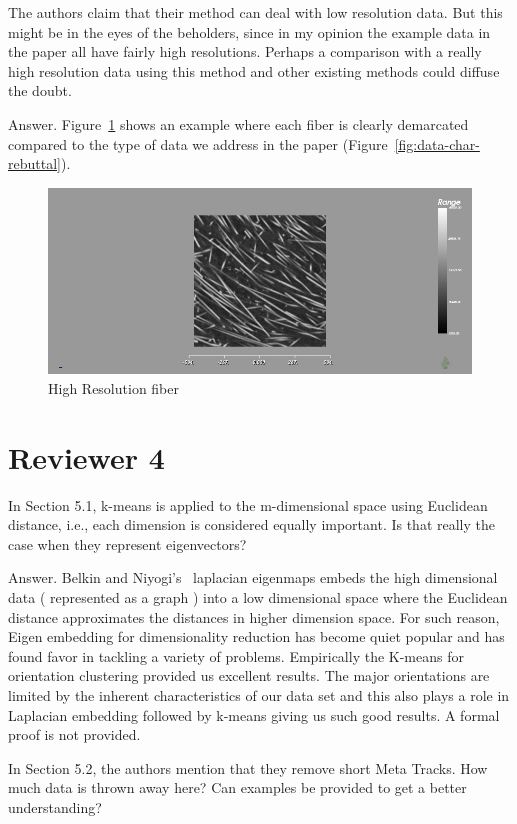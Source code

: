 \documentclass[]{article}
\begin{document}
\color{red}
The authors claim that their method can deal with low resolution data.
But this might be in the eyes of the beholders, since in my opinion the example data in the paper all have fairly high resolutions. Perhaps a comparison with a really high resolution data using this method and other existing methods could diffuse the doubt.
\color{black}

Answer. Figure~\ref{fig:glass_fibers} shows an example where each fiber is clearly demarcated compared to the type of data we address in the paper (Figure~\ref{fig:data-char-rebuttal}).
\begin{figure}
\centering
\includegraphics[width=0.7\linewidth]{images_pvis/glass_fibers}
\caption{High Resolution fiber}
\label{fig:glass_fibers}
\end{figure}


\section{Reviewer 4}
\color{red}
In Section 5.1, k-means is applied to the m-dimensional space using
Euclidean distance, i.e., each dimension is considered equally important.
Is that really the case when they represent eigenvectors?

\color{black}
Answer. Belkin  and Niyogi's~\cite{Belkin01} laplacian eigenmaps embeds the high dimensional data ( represented as a graph ) into a low dimensional space where the Euclidean distance approximates the distances in higher dimension space. For such reason, Eigen embedding for dimensionality reduction has become quiet popular and has found favor in tackling a variety of problems. Empirically the K-means for orientation clustering provided us excellent results. The major orientations are limited by the inherent characteristics of our data set and this also plays a role in Laplacian embedding followed by k-means giving us such good results. A formal proof is not provided. 

\color{red}
In Section 5.2, the authors mention that they remove short Meta Tracks.
How much data is thrown away here? Can examples be provided to get a
better understanding?
\color{black}
\end{document}
